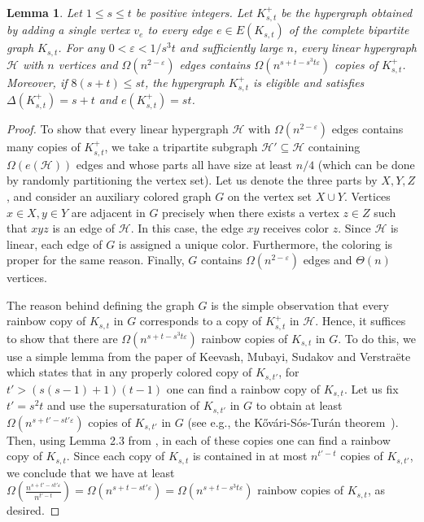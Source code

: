 \documentclass{daj}
\def\eps{\varepsilon}
\def\cH{\mathcal{H}}
\theoremstyle{plain}
\newtheorem{lemma}[theorem]{Lemma}
\theoremstyle{remark}
\begin{document}
\begin{lemma}\label{lemma:start}
Let $1\leq s\leq t$ be positive integers. Let $K_{s, t}^+$ be the hypergraph obtained by adding a single vertex $v_e$ to every edge $e\in E(K_{s, t})$ of the complete bipartite graph $K_{s, t}$. For any $0<\eps<1/s^3t$ and sufficiently large $n$, every linear hypergraph $\cH$ with $n$ vertices and $\Omega(n^{2-\eps})$ edges contains $\Omega(n^{s+t-s^3t\eps})$ copies of $K_{s, t}^+$. Moreover, if $8(s+t)\leq st$, the hypergraph $K_{s, t}^+$ is eligible and satisfies $\Delta(K_{s, t}^+)=s+t$ and $e(K_{s, t}^+)=st$.
\end{lemma}
\begin{proof}
To show that every linear hypergraph $\cH$ with $\Omega(n^{2-\eps})$ edges contains many copies of $K_{s, t}^+$, we take a tripartite subgraph $\cH'\subseteq \cH$ containing $\Omega(e(\cH))$ edges and whose parts all have size at least $n/4$ (which can be done by randomly partitioning the vertex set). Let us denote the three parts by $X, Y, Z$, and consider an auxiliary colored graph $G$ on the vertex set $X\cup Y$. Vertices $x\in X, y\in Y$ are adjacent in $G$ precisely when there exists a vertex $z\in Z$ such that $xyz$ is an edge of $\cH$. In this case, the edge $xy$ receives color $z$. Since $\cH$ is linear, each edge of $G$ is assigned a unique color. Furthermore, the coloring is proper for the same reason. Finally, $G$ contains $\Omega(n^{2-\eps})$ edges and $\Theta(n)$ vertices.

The reason behind defining the graph $G$ is the simple observation that every rainbow copy of $K_{s, t}$ in $G$ corresponds to a copy of $K_{s, t}^+$ in $\cH$. Hence, it suffices to show that there are $\Omega(n^{s+t-s^3t\eps})$ rainbow copies of $K_{s, t}$ in $G$. To do this, we use a simple lemma from the paper of Keevash, Mubayi, Sudakov and Verstra\"ete \cite{KMSV07} which states that in any properly colored copy of $K_{s, t'}$, for $t'>(s(s-1)+1)(t-1)$ one can find a rainbow copy of $K_{s, t}$. Let us fix $t'=s^2t$ and use the supersaturation of $K_{s, t'}$ in $G$ to obtain at least $\Omega(n^{s+t'-st'\eps})$ copies of $K_{s, t'}$ in $G$ (see e.g., the K\H{o}v\'{a}ri-S\'{o}s-Tur\'{a}n theorem~\cite{kHovari1954problem}). Then, using Lemma 2.3 from \cite{KMSV07}, in each of these copies one can find a rainbow copy of $K_{s, t}$. Since each copy of $K_{s, t}$ is contained in at most $n^{t'-t}$ copies of $K_{s, t'}$, we conclude that we have at least $\Omega(\frac{n^{s+t'-st'\eps}}{n^{t'-t}})=\Omega(n^{s+t-st'\eps})=\Omega(n^{s+t-s^3t\eps})$ rainbow copies of $K_{s, t}$, as desired.


\end{proof}
\end{document}
